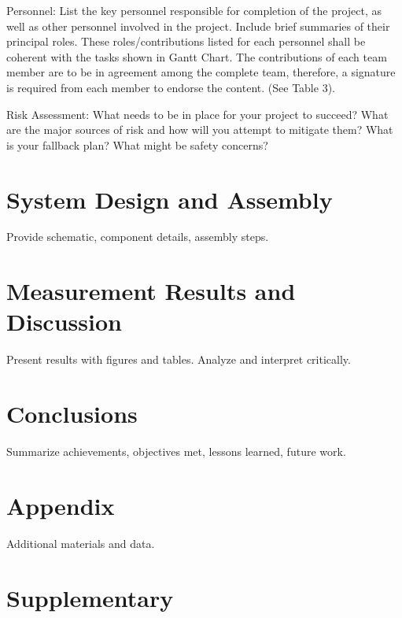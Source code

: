 \documentclass[10pt]{article}
\begin{document}
  Personnel: List the key personnel responsible for completion of the project,
  as well as other personnel involved in the project. Include brief summaries of
  their principal roles. These roles/contributions listed for each personnel
  shall be coherent with the tasks shown in Gantt Chart. The contributions of each
  team member are to be in agreement among the complete team, therefore, a signature
  is required from each member to endorse the content. (See Table 3).

  Risk Assessment: What needs to be in place for your project to succeed? What
  are the major sources of risk and how will you attempt to mitigate them? What is
  your fallback plan? What might be safety concerns?

  \section{System Design and Assembly}
  Provide schematic, component details, assembly steps.

  \section{Measurement Results and Discussion}
  Present results with figures and tables. Analyze and interpret critically.

  \section{Conclusions}
  Summarize achievements, objectives met, lessons learned, future work.


  \newpage
  \appendix
  \section{Appendix}
  Additional materials and data.

  \newpage
  \section{Supplementary}
\end{document}
